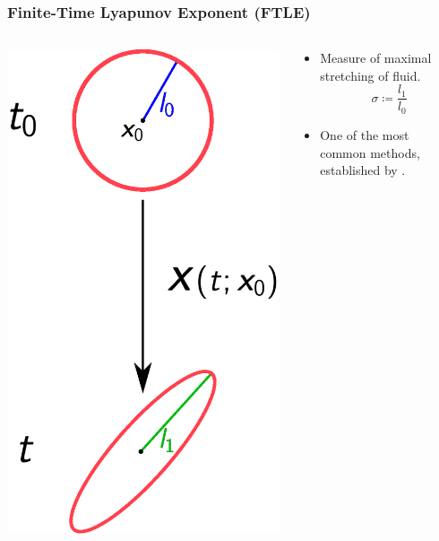 \documentclass[english,svgnames,notes=hide,14pt]{beamer}
\begin{document}
\begin{frame}
	\frametitle{Finite-Time Lyapunov Exponent (FTLE)}
	\begin{columns}[T,onlytextwidth]
	\begin{column}{.3\textwidth}
		\vspace{2.5mm}
		\includegraphics[scale=0.35]{imgs/ftle}
	\end{column}
	
	\begin{column}{.7\textwidth}
		\begin{itemize}
		\item Measure of maximal stretching of fluid.
		\[
		\sigma \coloneqq \frac{l_1}{l_0}
		\]
		\item One of the most common methods, established by \cite{shadden_2005_ftle}.
		\end{itemize}
	\end{column}
	\end{columns}

\end{frame}
\end{document}
